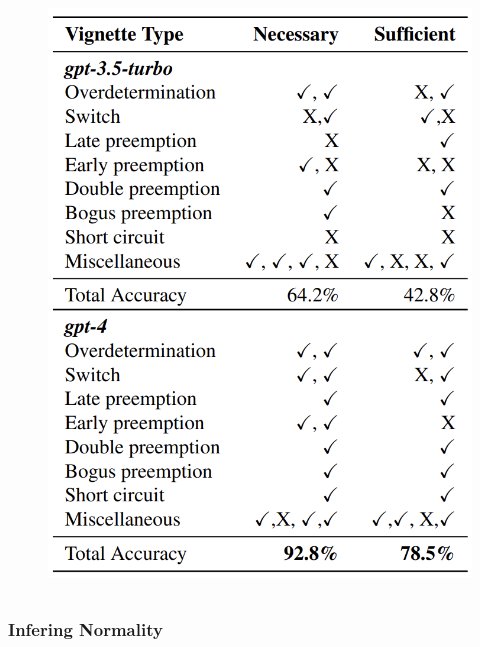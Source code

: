 \documentclass{beamer}
\begin{document}
\begin{frame}
\begin{columns}
\begin{column}{0.5\textwidth}
\begin{figure}
				\includegraphics[scale=0.15]{imgs/table_11_12.png}
			\end{figure}
		\end{column}
	\end{columns}
\end{frame}

\begin{frame}
	\frametitle{Infering Normality}

\end{frame}
\end{document}
